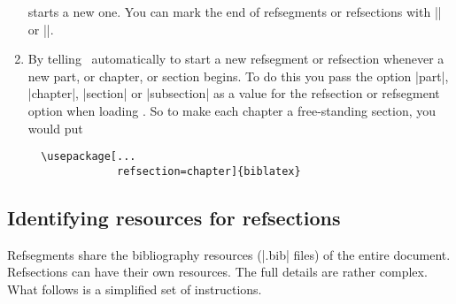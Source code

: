 \begin{enumerate}
  starts a new one. You can mark the end of refsegments or refsections
  with |\endrefsegment| or |\endrefsection|.
\item By telling \biblatex\ automatically to start a new refsegment or
  refsection whenever a new part, or chapter, or section begins. To do
  this you pass the option |part|, |chapter|, |section| or |subsection| as a
  value for the refsection or refsegment option when loading \biblatex.
  So to make each chapter a free-standing section, you would put
  \begin{marginfigure}
  \end{marginfigure}
\begin{Verbatim}
  \usepackage[...
              refsection=chapter]{biblatex}
\end{Verbatim}
\end{enumerate}

\subsection{Identifying resources for refsections}

Refsegments share the bibliography resources (|.bib| files) of the
entire document. Refsections can have their own resources. The full
details are rather complex. What follows is a simplified set of
instructions.

